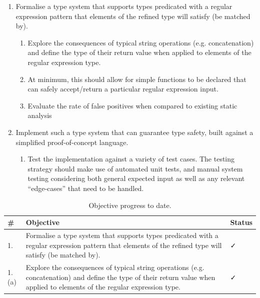 \documentclass[a4paper]{article}
\begin{document}
\begin{enumerate}
    \item Formalise a type system that supports types predicated with a regular expression pattern that elements of the refined type will satisfy (be matched by).
    \begin{enumerate}
        \item Explore the consequences of typical string operations (e.g. concatenation) and define the type of
        their return value when applied to elements of the regular expression type.

        \item At minimum, this should allow for simple functions to be declared that can safely accept/return a
        particular regular expression input.
        \item Evaluate the rate of false positives when compared to existing static analysis
    \end{enumerate}
    \item Implement such a type system that can guarantee type safety, built against a simplified proof-of-concept
    language.
    \begin{enumerate}
        \item Test the implementation against a variety of test cases. The testing strategy should make use of
        automated unit tests, and manual system testing considering both general expected input as well as
        any relevant ``edge-cases'' that need to be handled.
    \end{enumerate}
\end{enumerate}

\def\arraystretch{1.5}%
\begin{table}[H]
    \centering
    \begin{tabular}[t]{|p{1cm}|p{8cm}|p{1cm}|}
        \hline
        \rowcolor[HTML]{204F79}
        {\color[HTML]{FFFFFF} \sffamily \textbf{\#}} & {\color[HTML]{FFFFFF} \sffamily \textbf{Objective}} & {\color[HTML]{FFFFFF} \sffamily  \textbf{Status}} \\ \hline
        1. & Formalise a type system that supports types predicated with a regular expression pattern that elements of the refined type will satisfy (be matched by). & \faCheck{}           \\ \hline
        1. (a) & Explore the consequences of typical string operations (e.g. concatenation) and define the type of
        their return value when applied to elements of the regular expression type. & \faCheck{}           \\ \hline
    \end{tabular}
    \caption{Objective progress to date.}
    \label{satable}
\end{table}
\end{document}
